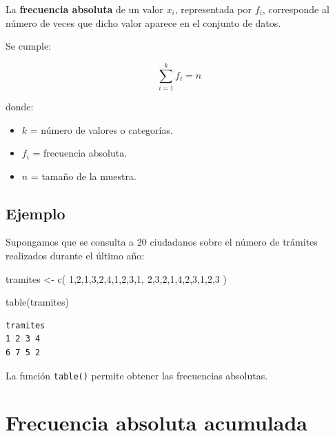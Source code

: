 \documentclass[
  spanish,
  14pt,
  letterpaper,
  DIV=11,
  numbers=noendperiod]{scrartcl}
\newenvironment{Shaded}{\begin{snugshade}}{\end{snugshade}}
\newcommand{\DecValTok}[1]{\textcolor[rgb]{0.68,0.51,1.00}{#1}}
\newcommand{\FunctionTok}[1]{\textcolor[rgb]{0.65,0.89,0.18}{#1}}
\newcommand{\NormalTok}[1]{\textcolor[rgb]{0.97,0.97,0.95}{#1}}
\newcommand{\OtherTok}[1]{\textcolor[rgb]{0.65,0.89,0.18}{#1}}
\providecommand{\tightlist}{%
  \setlength{\itemsep}{0pt}\setlength{\parskip}{0pt}}
\begin{document}
La \textbf{frecuencia absoluta} de un valor \(x_i\), representada por
\(f_i\), corresponde al número de veces que dicho valor aparece en el
conjunto de datos.

Se cumple:

\[
\sum_{i=1}^{k} f_i=n
\]

donde:

\begin{itemize}
\tightlist
\item
  \(k\) = número de valores o categorías.
\item
  \(f_i\) = frecuencia absoluta.
\item
  \(n\) = tamaño de la muestra.
\end{itemize}

\subsection{Ejemplo}\label{ejemplo}

Supongamos que se consulta a 20 ciudadanos sobre el número de trámites
realizados durante el último año:

\begin{Shaded}
\begin{Highlighting}[]
\NormalTok{tramites }\OtherTok{\textless{}{-}} \FunctionTok{c}\NormalTok{(}
  \DecValTok{1}\NormalTok{,}\DecValTok{2}\NormalTok{,}\DecValTok{1}\NormalTok{,}\DecValTok{3}\NormalTok{,}\DecValTok{2}\NormalTok{,}\DecValTok{4}\NormalTok{,}\DecValTok{1}\NormalTok{,}\DecValTok{2}\NormalTok{,}\DecValTok{3}\NormalTok{,}\DecValTok{1}\NormalTok{,}
  \DecValTok{2}\NormalTok{,}\DecValTok{3}\NormalTok{,}\DecValTok{2}\NormalTok{,}\DecValTok{1}\NormalTok{,}\DecValTok{4}\NormalTok{,}\DecValTok{2}\NormalTok{,}\DecValTok{3}\NormalTok{,}\DecValTok{1}\NormalTok{,}\DecValTok{2}\NormalTok{,}\DecValTok{3}
\NormalTok{)}

\FunctionTok{table}\NormalTok{(tramites)}
\end{Highlighting}
\end{Shaded}

\begin{verbatim}
tramites
1 2 3 4 
6 7 5 2 
\end{verbatim}

La función \texttt{table()} permite obtener las frecuencias absolutas.

\section{Frecuencia absoluta
acumulada}\label{frecuencia-absoluta-acumulada}
\end{document}
